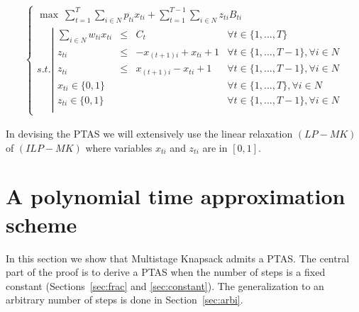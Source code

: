 \documentclass[a4paper]{book}
\begin{document}
\begin{center}
    \begin{eqnarray*}
     \ \left \{ \begin{array}{ll}
    \max \ \sum\limits_{t=1} ^ T \sum\limits_{i \in N} p_{ti} x_{ti} + \sum\limits_{t=1} ^ {T-1} \sum\limits_{i \in N} z_{ti}B_{ti}  \\
    s.t. \left |
    \begin{array}{llllll}
    \sum\limits_{i \in N} w_{ti} x_{ti} & \leq &C_t & \forall{t} \in \{1,...,T\} \\
    z_{ti} &\leq &-x_{(t+1)i} + x_{ti} +1 & \forall{t} \in \{1,...,T-1\},\forall{i} \in N\\
    z_{ti} &\leq & x_{(t+1)i} - x_{ti}+1 & \forall{t} \in \{1,...,T-1\},\forall{i} \in N\\
    x_{ti} \in \{0,1\} & & & \forall{t} \in \{1,...,T\}, \forall{i} \in N\\
    z_{ti} \in \{0,1\} & & & \forall{t} \in \{1,...,T-1\}, \forall{i} \in N\\
    \end{array}
    \right.
    \end{array} 
    \right.
    \end{eqnarray*}
    \end{center}



In devising the PTAS we will extensively use the linear relaxation $(LP-MK)$ of $(ILP-MK)$
where variables $x_{ti}$ and $z_{ti}$ are in $[0,1]$.







\section{A polynomial time approximation scheme}

In this section we show that {\sc Multistage  Knapsack} admits a PTAS. The central part of the proof is to derive a PTAS when the number of steps is a fixed constant (Sections~\ref{sec:frac} and \ref{sec:constant}). The generalization to an arbitrary number of steps is done in Section~\ref{sec:arbi}.
\end{document}

